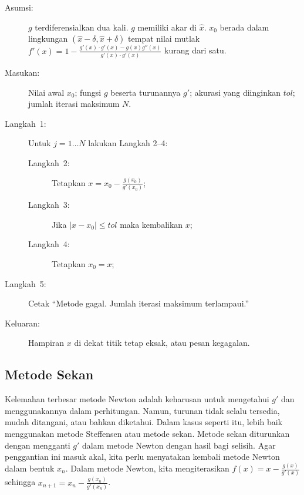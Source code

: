 \begin{pseudocode} 
\begin{description}
\item [{Asumsi:}] $g$ terdiferensialkan dua kali. $g$ memiliki akar di
$\hat{x}$. $x_{0}$ berada dalam lingkungan $(\hat{x}-\delta,\hat{x}+\delta)$
tempat nilai mutlak $f'(x)=1-\frac{g'(x)\cdot g'(x)-g(x)g''(x)}{g'(x)\cdot g'(x)}$
kurang dari satu.
\item [{Masukan:}] Nilai awal $x_{0}$; fungsi $g$ beserta turunannya
$g'$; akurasi yang diinginkan $tol$; jumlah iterasi maksimum $N$.
\item [{Langkah~1:}] Untuk $j=1\ldots N$ lakukan Langkah 2--4:

\begin{description}
\item [{Langkah~2:}] Tetapkan $x=x_{0}-\frac{g(x_{0})}{g'(x_{0})}$;
\item [{Langkah~3:}] Jika $|x-x_{0}|\leq tol$ maka kembalikan $x$;
\item [{Langkah~4:}] Tetapkan $x_{0}=x$;
\end{description}
\item [{Langkah~5:}] Cetak ``Metode gagal. Jumlah iterasi maksimum terlampaui.''
\item [{Keluaran:}] Hampiran $x$ di dekat titik tetap eksak, atau pesan
kegagalan.
\end{description}
\end{pseudocode}  

\subsection{Metode Sekan}

Kelemahan terbesar metode Newton adalah keharusan untuk mengetahui
$g'$ dan menggunakannya dalam perhitungan. Namun, turunan tidak selalu
tersedia, mudah ditangani, atau bahkan diketahui. Dalam kasus seperti
itu, lebih baik menggunakan metode Steffensen atau metode sekan. Metode
sekan diturunkan dengan mengganti $g'$ dalam metode Newton dengan
hasil bagi selisih. Agar penggantian ini masuk akal, kita perlu menyatakan
kembali metode Newton dalam bentuk $x_{n}$. Dalam metode Newton,
kita mengiterasikan $f(x)=x-\frac{g(x)}{g'(x)}$ sehingga $x_{n+1}=x_{n}-\frac{g(x_{n})}{g'(x_{n})}$.

